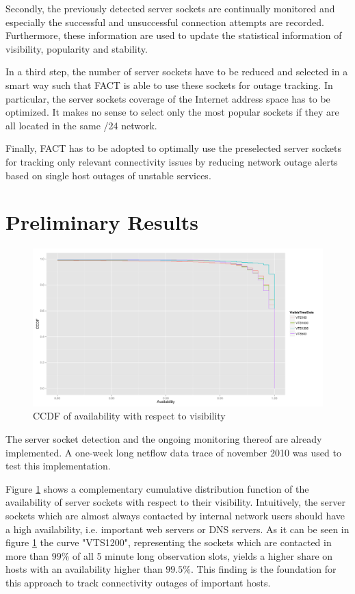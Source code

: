 \documentclass{sigcomm-alternate}
\begin{document}
Secondly, the previously detected server sockets are continually
monitored and especially the successful and unsuccessful connection
attempts are recorded. Furthermore, these information are used to update
the statistical information of visibility, popularity and stability.

In a third step, the number of server sockets have to be reduced and
selected in a smart way such that FACT is able to use these sockets
for outage tracking. In particular, the server sockets coverage of the
Internet address space has to be optimized. It makes no sense to select
only the most popular sockets if they are all located in the same /24
network.

Finally, FACT has to be adopted to optimally use the preselected server
sockets for tracking only relevant connectivity issues by reducing
network outage alerts based on single host outages of unstable services.

\section{Preliminary Results} \begin{figure}[ht!]
\centering \includegraphics[width=18cm]{images/RATIO_VTS_External.pdf}
\caption{CCDF of availability with respect to visibility}
\label{fig:RatioVTS} \end{figure} The server socket detection and
the ongoing monitoring thereof are already implemented. A one-week
long netflow data trace of november 2010 was used to test this
implementation.

Figure \ref{fig:RatioVTS} shows a complementary cumulative distribution
function of the availability of server sockets with respect to their
visibility. Intuitively, the server sockets which are almost always
contacted by internal network users should have a high availability,
i.e. important web servers or DNS servers. As it can be seen in
figure \ref{fig:RatioVTS} the curve "VTS1200", representing the
sockets which are contacted in more than $99\%$ of all 5 minute
long observation slots, yields a higher share on hosts with an
availability higher than $99.5\%$. This finding is the foundation
for this approach to track connectivity outages of important hosts.
\end{document}
